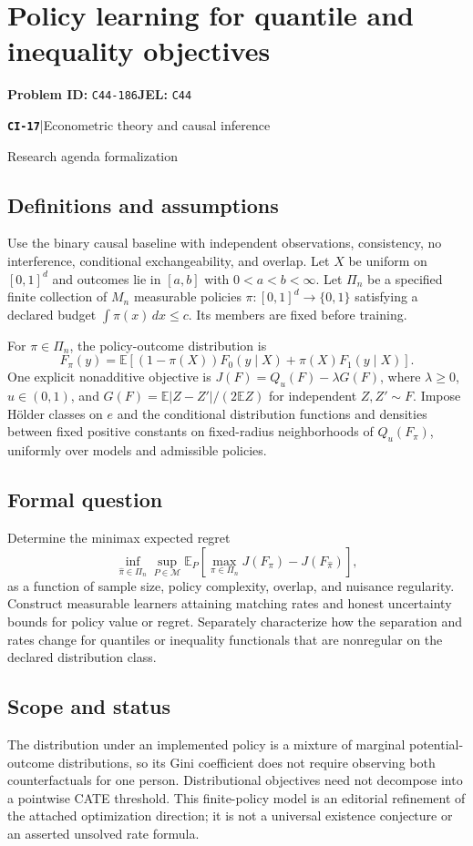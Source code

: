 \documentclass[11pt,a4paper]{article}
\newcommand{\E}{\mathbb E}
\newcommand{\entrymeta}[3]{{\sffamily\small\color{muted}\textbf{\texttt{#1}}\quad|\quad #2\par #3\par}}
\begin{document}
\section*{Policy learning for quantile and inequality objectives}
\textbf{Problem ID:} \texttt{C44-186}\quad \textbf{JEL:} \texttt{C44}\par
\label{problem:OP-0496}
\label{beyond:CI-17}
\entrymeta{CI-17}{Econometric theory and causal inference}{Research agenda formalization}
\subsection*{Definitions and assumptions}
Use the binary causal baseline with independent observations, consistency, no interference, conditional exchangeability, and overlap. Let $X$ be uniform on $[0,1]^d$ and outcomes lie in $[a,b]$ with $0<a<b<\infty$. Let $\Pi_n$ be a specified finite collection of $M_n$ measurable policies $\pi:[0,1]^d\to\{0,1\}$ satisfying a declared budget $\int\pi(x)\,dx\leq c$. Its members are fixed before training.

For $\pi\in\Pi_n$, the policy-outcome distribution is
\[
F_\pi(y)=\E[(1-\pi(X))F_0(y\mid X)+\pi(X)F_1(y\mid X)].
\]
One explicit nonadditive objective is $J(F)=Q_u(F)-\lambda G(F)$, where $\lambda\geq0$, $u\in(0,1)$, and
$G(F)=\E|Z-Z'|/(2\E Z)$ for independent $Z,Z'\sim F$.
Impose Hölder classes on $e$ and the conditional distribution functions and densities between fixed positive constants on fixed-radius neighborhoods of $Q_u(F_\pi)$, uniformly over models and admissible policies.
\subsection*{Formal question}
Determine the minimax expected regret
\[
\inf_{\widehat\pi\in\Pi_n}\sup_{P\in\mathcal M}
\E_P\!\left[\max_{\pi\in\Pi_n}J(F_\pi)
                 -J(F_{\widehat\pi})\right],
\]
as a function of sample size, policy complexity, overlap, and nuisance regularity. Construct measurable learners attaining matching rates and honest uncertainty bounds for policy value or regret. Separately characterize how the separation and rates change for quantiles or inequality functionals that are nonregular on the declared distribution class.
\subsection*{Scope and status}
The distribution under an implemented policy is a mixture of marginal potential-outcome distributions, so its Gini coefficient does not require observing both counterfactuals for one person. Distributional objectives need not decompose into a pointwise CATE threshold. This finite-policy model is an editorial refinement of the attached optimization direction; it is not a universal existence conjecture or an asserted unsolved rate formula.
\end{document}
